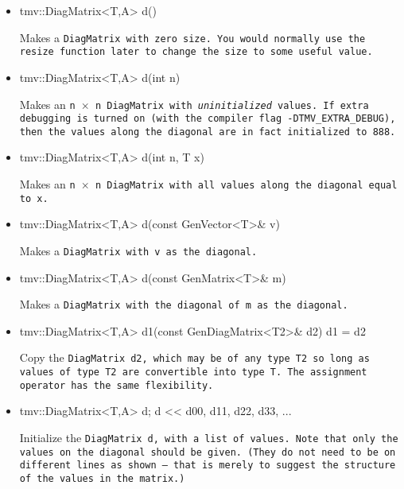 \begin{itemize}

\item
\begin{tmvcode}
tmv::DiagMatrix<T,A> d()
\end{tmvcode}
Makes a \tt{DiagMatrix} with zero size.  You would normally use the \tt{resize} function later to
change the size to some useful value.

\item 
\begin{tmvcode}
tmv::DiagMatrix<T,A> d(int n)
\end{tmvcode}
Makes an \tt{n} $\times$ \tt{n} \tt{DiagMatrix} with {\em uninitialized} values.
If extra debugging is turned on (with the compiler flag \tt{-DTMV\_EXTRA\_DEBUG}), then the values along the diagonal are in fact initialized to 888. 

\item
\begin{tmvcode}
tmv::DiagMatrix<T,A> d(int n, T x)
\end{tmvcode}
Makes an \tt{n} $\times$ \tt{n} \tt{DiagMatrix} with all values along the diagonal equal to \tt{x}.

\item
\begin{tmvcode}
tmv::DiagMatrix<T,A> d(const GenVector<T>& v)
\end{tmvcode}
Makes a \tt{DiagMatrix} with \tt{v} as the diagonal.

\item 
\begin{tmvcode}
tmv::DiagMatrix<T,A> d(const GenMatrix<T>& m)
\end{tmvcode}
Makes a \tt{DiagMatrix} with the diagonal of \tt{m} as the diagonal.

\item
\begin{tmvcode}
tmv::DiagMatrix<T,A> d1(const GenDiagMatrix<T2>& d2)
d1 = d2
\end{tmvcode}
Copy the \tt{DiagMatrix d2}, which may be of any type \tt{T2} so long
as values of type \tt{T2} are convertible into type \tt{T}.
The assignment operator has the same flexibility.

\item
\begin{tmvcode}
tmv::DiagMatrix<T,A> d;
d << d00,
         d11,
             d22,
                 d33, 
                     ...
\end{tmvcode}
Initialize the \tt{DiagMatrix d}, with a list of values.  Note that only the values on the diagonal should be given.  (They do not need to be on different lines as shown -- that is merely to suggest the structure of the values in the matrix.)


\end{itemize}
